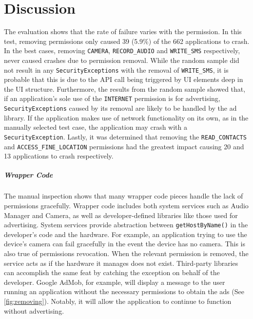 \chapter{Discussion}
\label{sec:discussion}
The evaluation shows that the rate of failure varies with the permission.  In this test, removing permissions only caused 39 (5.9\%) of the 662 applications to crash.   In the best cases, removing \texttt{CAMERA}, \texttt{RECORD\_AUDIO} and \texttt{WRITE\_SMS} respectively, never caused crashes due to permission removal.  While the random sample did not result in any \texttt{SecurityExceptions} with the removal of \texttt{WRITE\_SMS}, it is probable that this is due to the API call being triggered by UI elements deep in the UI structure.  Furthermore, the results from the random sample showed that, if an application's sole use of the \texttt{INTERNET} permission is for advertising, \texttt{SecurityExceptions} caused by its removal are likely to be handled by the ad library.  If the application makes use of network functionality on its own, as in the manually selected test case, the application may crash with a \texttt{SecurityException}. Lastly, it was determined that removing the \texttt{READ\_CONTACTS} and \texttt{ACCESS\_FINE\_LOCATION} permissions had the greatest impact causing 20 and 13 applications to crash respectively.      

\paragraph{\bfseries Wrapper Code}
The manual inspection shows that many wrapper code pieces handle the lack of permissions gracefully.  Wrapper code includes both system services such as Audio Manager and Camera, as well as developer-defined libraries like those used for advertising.  System services provide abstraction between \texttt{getHostByName()} in the developer's code and the hardware.  For example, an application trying to use the device's camera can fail gracefully in the event the device has no camera.  This is also true of permissions revocation.  When the relevant permission is removed, the service acts as if the hardware it manages does not exist.  Third-party libraries can accomplish the same feat by catching the exception on behalf of the developer.  Google AdMob, for example, will display a message to the user running an application without the necessary permissions to obtain the ads (See \ref{fig:removing}).  Notably, it will allow the application to continue to function without advertising.  

